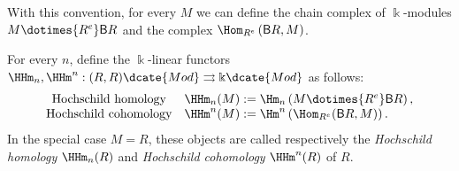 With this convention, for every $M$ we can define the chain complex of
$\Bbbk$-modules $M\dotimes{R^e}\mathsf{B}R$ and the complex
$\Hom_{R^e}\left(\mathsf{B}R,M\right)$.

\begin{definition}[G.\ Hochschild]\label{def:HH}
	For every $n$, define the $\Bbbk$-linear functors
	$\HHm_n,\HHm^n:(R,R)\dcate{Mod}\rightrightarrows\Bbbk\dcate{Mod}$ as
	follows:
	\[\begin{array}{cl}
		\text{Hochschild homology}
		& \HHm_n(M) := \Hm_n\left(M\dotimes{R^e}\mathsf{B}R\right), \\
		\text{Hochschild cohomology}
		& \HHm^n(M) := \Hm^n\left(\Hom_{R^e}(\mathsf{B}R,M)\right).
	\end{array}\]
	In the special case $M=R$, these objects are called respectively the
	\emph{Hochschild homology} $\HHm_n(R)$ and \emph{Hochschild cohomology}
	$\HHm^n(R)$ of $R$.
\end{definition}

